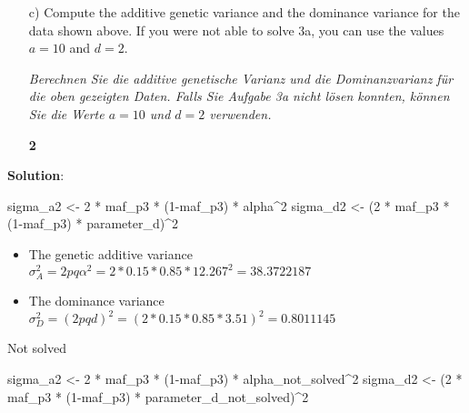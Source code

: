 \documentclass[
]{article}
\newenvironment{Shaded}{\begin{snugshade}}{\end{snugshade}}
\newcommand{\DecValTok}[1]{\textcolor[rgb]{0.00,0.00,0.81}{#1}}
\newcommand{\NormalTok}[1]{#1}
\newcommand{\OtherTok}[1]{\textcolor[rgb]{0.56,0.35,0.01}{#1}}
\newcommand{\SpecialCharTok}[1]{\textcolor[rgb]{0.00,0.00,0.00}{#1}}
\providecommand{\tightlist}{%
  \setlength{\itemsep}{0pt}\setlength{\parskip}{0pt}}
\newcommand{\points}[1]
{\begin{flushright}\textbf{#1}\end{flushright}}
\newcommand{\solstart}
{\vspace{3ex}\textbf{Solution}:}
\begin{document}
\vspace{3ex}
\begin{enumerate}
\item[c)] Compute the additive genetic variance and the dominance variance for the data shown above. If you were not able to solve 3a, you can use the values $a = 10$ and $d = 2$. 

\textit{Berechnen Sie die additive genetische Varianz und die Dominanzvarianz für die oben gezeigten Daten. Falls Sie Aufgabe 3a nicht lösen konnten, können Sie die Werte $a=10$ und $d = 2$ verwenden.}
\points{2}
\end{enumerate}

\solstart

\begin{Shaded}
\begin{Highlighting}[]
\NormalTok{sigma\_a2 }\OtherTok{\textless{}{-}} \DecValTok{2} \SpecialCharTok{*}\NormalTok{ maf\_p3 }\SpecialCharTok{*}\NormalTok{ (}\DecValTok{1}\SpecialCharTok{{-}}\NormalTok{maf\_p3) }\SpecialCharTok{*}\NormalTok{ alpha}\SpecialCharTok{\^{}}\DecValTok{2}
\NormalTok{sigma\_d2 }\OtherTok{\textless{}{-}}\NormalTok{ (}\DecValTok{2} \SpecialCharTok{*}\NormalTok{ maf\_p3 }\SpecialCharTok{*}\NormalTok{ (}\DecValTok{1}\SpecialCharTok{{-}}\NormalTok{maf\_p3) }\SpecialCharTok{*}\NormalTok{ parameter\_d)}\SpecialCharTok{\^{}}\DecValTok{2}
\end{Highlighting}
\end{Shaded}

\begin{itemize}
\tightlist
\item
  The genetic additive variance
  \(\sigma_A^2 = 2pq\alpha^2 = 2 * 0.15 * 0.85 * 12.267^2 = 38.3722187\)
\item
  The dominance variance
  \(\sigma_D^2 = \left(2pqd \right)^2 = (2* 0.15 * 0.85 * 3.51) ^2 = 0.8011145\)
\end{itemize}

Not solved

\begin{Shaded}
\begin{Highlighting}[]
\NormalTok{sigma\_a2 }\OtherTok{\textless{}{-}} \DecValTok{2} \SpecialCharTok{*}\NormalTok{ maf\_p3 }\SpecialCharTok{*}\NormalTok{ (}\DecValTok{1}\SpecialCharTok{{-}}\NormalTok{maf\_p3) }\SpecialCharTok{*}\NormalTok{ alpha\_not\_solved}\SpecialCharTok{\^{}}\DecValTok{2}
\NormalTok{sigma\_d2 }\OtherTok{\textless{}{-}}\NormalTok{ (}\DecValTok{2} \SpecialCharTok{*}\NormalTok{ maf\_p3 }\SpecialCharTok{*}\NormalTok{ (}\DecValTok{1}\SpecialCharTok{{-}}\NormalTok{maf\_p3) }\SpecialCharTok{*}\NormalTok{ parameter\_d\_not\_solved)}\SpecialCharTok{\^{}}\DecValTok{2}
\end{Highlighting}
\end{Shaded}
\end{document}
